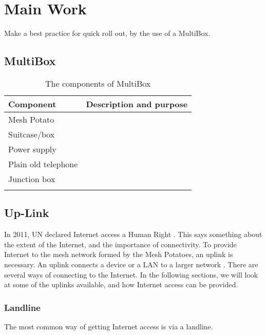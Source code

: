 \chapter{Main Work}
\label{chp:quickrollout} 

Make a best practice for quick roll out, by the use of a MultiBox. 

\section{MultiBox}


\begin{center}
\begin{table}[!ht]
\caption{\label{tab:components}The components of MultiBox}
    \begin{tabular}{ | l | p{9cm} |}
    \hline
    \textbf{Component} & \textbf{Description and purpose} \\ 
    \hline
    Mesh Potato &  \\ 
    \hline
    Suitcase/box &   \\ 
    \hline
    Power supply & \\
    \hline
    Plain old telephone & \\
	\hline
	Junction box & \\
	\hline
	 & \\
	\hline
    \end{tabular}
   \end{table}
\end{center}


\section{Up-Link}
In 2011, UN declared Internet access a Human Right \cite{HR}. This says something about the extent of the Internet, and the importance of connectivity. 
To provide Internet to the mesh network formed by the Mesh Potatoes, an uplink is necessary. An uplink connects a device or a LAN to a larger network \cite{uplink}. There are several ways of connecting to the Internet. In the following sections, we will look at some of the uplinks available, and how Internet access can be provided. 


\subsection{Landline}
The most common way of getting Internet access is via a landline. 

